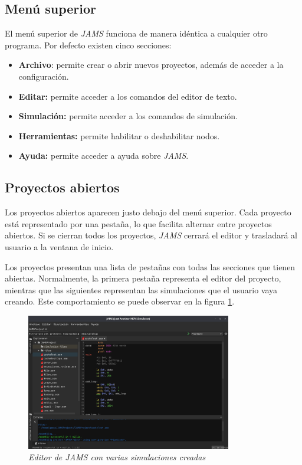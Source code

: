 \subsection{Menú superior}\label{subsec:menu-superior}

El menú superior de \textit{JAMS} funciona de manera idéntica
a cualquier otro programa.
Por defecto existen cinco secciones:
\begin{itemize}
    \item \textbf{Archivo}: permite crear o abrir nuevos proyectos, además de
    acceder a la configuración.
    \item \textbf{Editar:} permite acceder a los comandos del editor de texto.
    \item \textbf{Simulación:} permite acceder a los comandos de simulación.
    \item \textbf{Herramientas:} permite habilitar o deshabilitar nodos.
    \item \textbf{Ayuda:} permite acceder a ayuda sobre \textit{JAMS}.
\end{itemize}

\subsection{Proyectos abiertos}\label{subsec:proyectos-abiertos}

Los proyectos abiertos aparecen justo debajo del menú superior.
Cada proyecto está representado por una pestaña, lo que facilita alternar entre
proyectos abiertos.
Si se cierran todos los proyectos, \textit{JAMS} cerrará el editor y trasladará
al usuario a la ventana de inicio.

Los proyectos presentan una lista de pestañas con todas las secciones
que tienen abiertas.
Normalmente, la primera pestaña representa el editor del proyecto, mientras que
las siguientes representan las simulaciones que el usuario vaya creando.
Este comportamiento se puede observar en la figura \ref{fig:jams-sections}.

\begin{figure}[H]
    \centering
    \includegraphics[width=0.8\textwidth]{images/base/jams-sections}
    \caption{\textit{Editor de \textit{JAMS} con varias simulaciones creadas}}
    \label{fig:jams-sections}
\end{figure}

